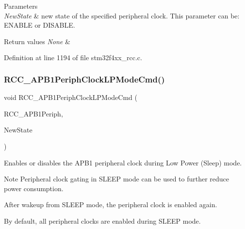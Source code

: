\begin{DoxyParams}{Parameters}
\\
\hline
{\em New\+State} & new state of the specified peripheral clock. This parameter can be\+: E\+N\+A\+B\+LE or D\+I\+S\+A\+B\+LE. \\
\hline
\end{DoxyParams}

\begin{DoxyRetVals}{Return values}
{\em None} & \\
\hline
\end{DoxyRetVals}


Definition at line 1194 of file stm32f4xx\+\_\+rcc.\+c.

\mbox{\label{group___r_c_c_ga84dd64badb84768cbcf19e241cadff50}} 
\subsubsection{\texorpdfstring{R\+C\+C\+\_\+\+A\+P\+B1\+Periph\+Clock\+L\+P\+Mode\+Cmd()}{RCC\_APB1PeriphClockLPModeCmd()}}
{\footnotesize\ttfamily void R\+C\+C\+\_\+\+A\+P\+B1\+Periph\+Clock\+L\+P\+Mode\+Cmd (\begin{DoxyParamCaption}\item[{uint32\+\_\+t}]{R\+C\+C\+\_\+\+A\+P\+B1\+Periph,  }\item[{Functional\+State}]{New\+State }\end{DoxyParamCaption})}



Enables or disables the A\+P\+B1 peripheral clock during Low Power (Sleep) mode. 

\begin{DoxyNote}{Note}
Peripheral clock gating in S\+L\+E\+EP mode can be used to further reduce power consumption. 

After wakeup from S\+L\+E\+EP mode, the peripheral clock is enabled again. 

By default, all peripheral clocks are enabled during S\+L\+E\+EP mode. 
\end{DoxyNote}

